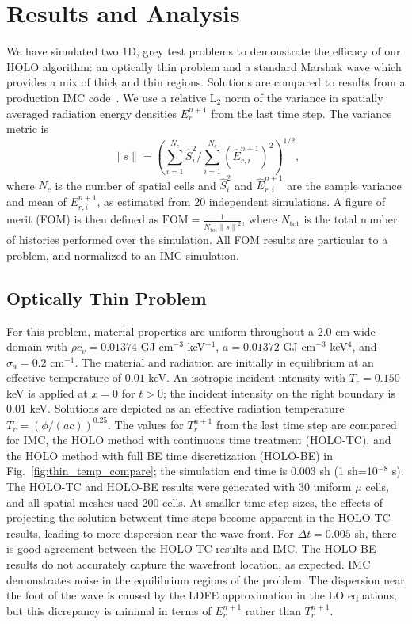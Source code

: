 \documentclass{anstrans}
\newcommand{\FOM}{\ensuremath{\text{FOM}}}
\newcommand{\invcm}[0]{cm$^{-1}$}
\renewcommand{\ss}{\ensuremath{\|s\|}}
\begin{document}
\section*{Results and Analysis}

We have simulated two 1D, grey test problems to demonstrate the efficacy of our HOLO
algorithm: an optically thin problem and a standard Marshak wave which provides a mix of thick and
thin regions.  Solutions are compared to results from a production IMC code~\cite{jayenne}.
We use a relative L$_2$ norm of the variance in spatially averaged radiation energy
densities $E_r^{n+1}$ from the last time step. The variance metric is
\begin{equation}
    \ss = \left({{\sum\limits_{i=1}^{N_c}
\hat S_i^2}\bigg/{\sum\limits_{i=1}^{N_c} \left(\hat{E}_{r,i}^{n+1}\right)^2}}\right)^{1/2},
\end{equation}
where $N_c$ is the number of spatial cells and $\hat S_i^2$ and $\hat E_{r,i}^{n+1}$ are the
sample variance and mean of $E_{r,i}^{n+1}$, as estimated from 20 independent simulations.  A figure of merit (FOM) is
then defined as $\FOM = \frac{1}{N_{\text{tot}}\ss^2}$,
where $N_{\text{tot}}$ is the total number of histories performed over the simulation. All FOM results
are particular to a problem, and normalized to an IMC simulation.

\subsection{Optically Thin Problem}

For this problem, material properties
are uniform throughout a 2.0 cm wide domain with $\rho c_v = 0.01374$ GJ cm$^{-3}$
keV$^{-1}$, $a=0.01372$ GJ cm$^{-3}$ keV$^{4}$, and $\sigma_a=0.2$ \invcm.  
The material and radiation are initially in equilibrium at an effective temperature of $0.01$ keV.
An isotropic incident intensity with $T_r = 0.150$ keV is applied
at $x=0$ for $t>0$; the incident intensity on the right boundary is $0.01$ keV.
 Solutions are depicted as an effective radiation temperature
 $T_r=\left(\phi/(ac)\right)^{0.25}$. The values for $T_r^{n+1}$ from the last
 time step are compared for IMC, the HOLO method with continuous time treatment (HOLO-TC), and
 the HOLO method with full BE time discretization (HOLO-BE) in
 Fig.~\ref{fig:thin_temp_compare}; the simulation end time is 0.003 sh (1 sh=10$^{-8}$ s). The HOLO-TC and HOLO-BE results were generated with 30
uniform $\mu$ cells, and all spatial meshes used 200 cells.  At smaller time step sizes, the
effects of projecting the solution betweent time steps become apparent in the HOLO-TC results, leading to more
dispersion near the wave-front.  For $\Delta t=0.005$ sh, there is good agreement between
the HOLO-TC results and IMC.  The HOLO-BE results do not accurately capture
the wavefront location, as expected. IMC demonstrates noise in the equilibrium
regions of the problem. The dispersion near the foot of the wave is caused by
the LDFE approximation in the LO equations, but this dicrepancy is minimal in
terms of $E_r^{n+1}$ rather than $T_r^{n+1}$.
\end{document}
